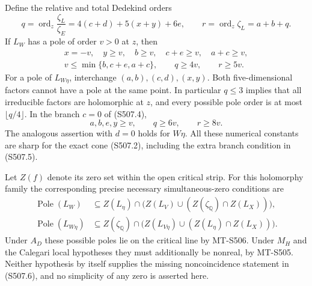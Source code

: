 Define the relative and total Dedekind orders
\[
 q=\operatorname{ord}_z\frac{\zeta_L}{\zeta_E}
       =4(c+d)+5(x+y)+6e,
 \qquad
 r=\operatorname{ord}_z\zeta_L=a+b+q.
 \tag{S507.3}
\]
If $L_W$ has a pole of order $v>0$ at $z$, then
\[
 \begin{gathered}
 x=-v,\quad y\ge v,\quad b\ge v,\quad c+e\ge v,
       \quad a+c\ge v,\\
 v\le\min\{b,c+e,a+c\},\qquad q\ge4v,\qquad r\ge5v.
 \end{gathered}
 \tag{S507.4}
\]
For a pole of $L_{W\eta}$, interchange
$(a,b),(c,d),(x,y)$.  Both five-dimensional factors cannot have
a pole at the same point.  In particular $q\le3$ implies that
all irreducible factors are holomorphic at $z$, and every possible
pole order is at most $\lfloor q/4\rfloor$.
In the branch $c=0$ of (S507.4),
\[
        a,b,e,y\ge v,\qquad q\ge6v,\qquad r\ge8v.
 \tag{S507.5}
\]
The analogous assertion with $d=0$ holds for $W\eta$.
All these numerical constants are sharp for the exact cone
(S507.2), including the extra branch condition in (S507.5).

Let $Z(f)$ denote its zero set within the open critical strip.
For this holomorphy family the corresponding precise necessary
simultaneous-zero conditions are
\[
\begin{aligned}
 \operatorname{Pole}(L_W)&\subseteq
 Z(L_\eta)\cap\bigl(Z(L_V)\cup
             (Z(\zeta_{\mathbb Q})\cap Z(L_X))\bigr),\\
 \operatorname{Pole}(L_{W\eta})&\subseteq
 Z(\zeta_{\mathbb Q})\cap\bigl(Z(L_{V\eta})\cup
             (Z(L_\eta)\cap Z(L_X))\bigr).
\end{aligned}
 \tag{S507.6}
\]
Under $A_D$ these possible poles lie on the critical line by
MT-S506.  Under $M_H$ and the Calegari local hypotheses they
must additionally be nonreal, by MT-S505.  Neither hypothesis
by itself supplies the missing noncoincidence statement in
(S507.6), and no simplicity of any zero is asserted here.


